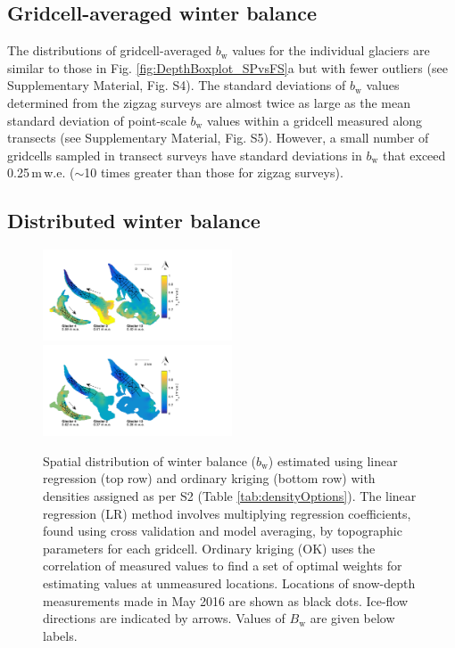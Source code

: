 \documentclass[review,oneside, letterpaper]{igs}
\begin{document}
\subsection{Gridcell-averaged winter balance}

The distributions of gridcell-averaged $b_\mathrm{w}$ values for the individual glaciers are similar to those in Fig. \ref{fig:DepthBoxplot_SPvsFS}a but with fewer outliers (see Supplementary Material, Fig. S4). The standard deviations of $b_\mathrm{w}$ values determined from the zigzag surveys are almost twice as large as the mean standard deviation of point-scale $b_\mathrm{w}$ values within a gridcell measured along transects (see Supplementary Material, Fig. S5). However, a small number of gridcells sampled in transect surveys have standard deviations in $b_\mathrm{w}$ that exceed 0.25\,m\,w.e. ($\sim$10 times greater than those for zigzag surveys). 

\subsection{Distributed winter balance}

\begin{figure}
	\centering
	\includegraphics[width =0.5\textwidth]{LR_map.pdf}\\
    \includegraphics[width =0.5\textwidth]{OK_map.pdf}\\
	\caption{Spatial distribution of winter balance ($b_\mathrm{w}$) estimated using linear regression (top row) and ordinary kriging (bottom row) with densities assigned as per S2 (Table \ref{tab:densityOptions}). The linear regression (LR) method involves multiplying regression coefficients, found using cross validation and model averaging, by topographic parameters for each gridcell. Ordinary kriging (OK) uses the correlation of measured values to find a set of optimal weights for estimating values at unmeasured locations. Locations of snow-depth measurements made in May 2016 are shown as black dots. Ice-flow directions are indicated by arrows. Values of $B_\mathrm{w}$ are given below labels.}
	\label{fig:LR_OK_map}
\end{figure}
\end{document}
